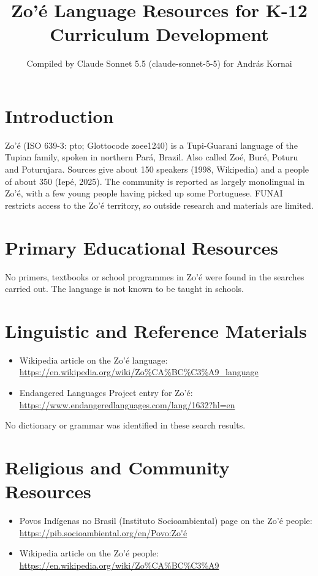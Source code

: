\documentclass[12pt]{article}
\title{Zo'\'e Language Resources for K-12 Curriculum Development}
\author{Compiled by Claude Sonnet 5.5 (claude-sonnet-5-5) for Andr\'as Kornai}
\date{}
\begin{document}
\maketitle

\section{Introduction}
Zo'\'e (ISO 639-3: pto; Glottocode zoee1240) is a Tupi-Guarani language of the Tupian family, spoken in northern Par\'a, Brazil. Also called Zo\'e, Bur\'e, Poturu and Poturujara. Sources give about 150 speakers (1998, Wikipedia) and a people of about 350 (Iep\'e, 2025). The community is reported as largely monolingual in Zo'\'e, with a few young people having picked up some Portuguese. FUNAI restricts access to the Zo'\'e territory, so outside research and materials are limited.

\section{Primary Educational Resources}
No primers, textbooks or school programmes in Zo'\'e were found in the searches carried out. The language is not known to be taught in schools.

\section{Linguistic and Reference Materials}
\begin{itemize}
\item Wikipedia article on the Zo'\'e language: \url{https://en.wikipedia.org/wiki/Zo%CA%BC%C3%A9_language}
\item Endangered Languages Project entry for Zo'\'e: \url{https://www.endangeredlanguages.com/lang/1632?hl=en}
\end{itemize}
No dictionary or grammar was identified in these search results.

\section{Religious and Community Resources}
\begin{itemize}
\item Povos Ind\'igenas no Brasil (Instituto Socioambiental) page on the Zo'\'e people: \url{https://pib.socioambiental.org/en/Povo:Zo'é}
\item Wikipedia article on the Zo'\'e people: \url{https://en.wikipedia.org/wiki/Zo%CA%BC%C3%A9}
\end{itemize}
\end{document}
